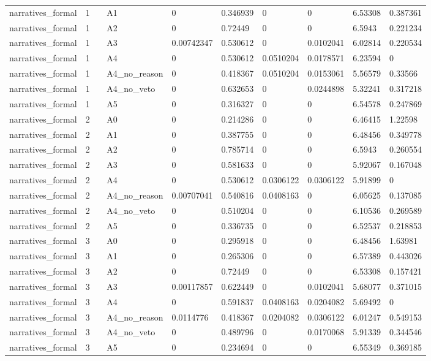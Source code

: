 \documentclass[11pt]{article}
\begin{document}
\begin{landscape}
\begin{longtable}{@{}L{0.120\linewidth}L{0.085\linewidth}L{0.085\linewidth}L{0.085\linewidth}L{0.085\linewidth}L{0.085\linewidth}L{0.085\linewidth}L{0.085\linewidth}L{0.085\linewidth}@{}}
narratives\_formal & 1 & A1 & 0 & 0.346939 & 0 & 0 & 6.53308 & 0.387361 \\
narratives\_formal & 1 & A2 & 0 & 0.72449 & 0 & 0 & 6.5943 & 0.221234 \\
narratives\_formal & 1 & A3 & 0.00742347 & 0.530612 & 0 & 0.0102041 & 6.02814 & 0.220534 \\
narratives\_formal & 1 & A4 & 0 & 0.530612 & 0.0510204 & 0.0178571 & 6.23594 & 0 \\
narratives\_formal & 1 & A4\_no\_reason & 0 & 0.418367 & 0.0510204 & 0.0153061 & 5.56579 & 0.33566 \\
narratives\_formal & 1 & A4\_no\_veto & 0 & 0.632653 & 0 & 0.0244898 & 5.32241 & 0.317218 \\
narratives\_formal & 1 & A5 & 0 & 0.316327 & 0 & 0 & 6.54578 & 0.247869 \\
narratives\_formal & 2 & A0 & 0 & 0.214286 & 0 & 0 & 6.46415 & 1.22598 \\
narratives\_formal & 2 & A1 & 0 & 0.387755 & 0 & 0 & 6.48456 & 0.349778 \\
narratives\_formal & 2 & A2 & 0 & 0.785714 & 0 & 0 & 6.5943 & 0.260554 \\
narratives\_formal & 2 & A3 & 0 & 0.581633 & 0 & 0 & 5.92067 & 0.167048 \\
narratives\_formal & 2 & A4 & 0 & 0.530612 & 0.0306122 & 0.0306122 & 5.91899 & 0 \\
narratives\_formal & 2 & A4\_no\_reason & 0.00707041 & 0.540816 & 0.0408163 & 0 & 6.05625 & 0.137085 \\
narratives\_formal & 2 & A4\_no\_veto & 0 & 0.510204 & 0 & 0 & 6.10536 & 0.269589 \\
narratives\_formal & 2 & A5 & 0 & 0.336735 & 0 & 0 & 6.52537 & 0.218853 \\
narratives\_formal & 3 & A0 & 0 & 0.295918 & 0 & 0 & 6.48456 & 1.63981 \\
narratives\_formal & 3 & A1 & 0 & 0.265306 & 0 & 0 & 6.57389 & 0.443026 \\
narratives\_formal & 3 & A2 & 0 & 0.72449 & 0 & 0 & 6.53308 & 0.157421 \\
narratives\_formal & 3 & A3 & 0.00117857 & 0.622449 & 0 & 0.0102041 & 5.68077 & 0.371015 \\
narratives\_formal & 3 & A4 & 0 & 0.591837 & 0.0408163 & 0.0204082 & 5.69492 & 0 \\
narratives\_formal & 3 & A4\_no\_reason & 0.0114776 & 0.418367 & 0.0204082 & 0.0306122 & 6.01247 & 0.549153 \\
narratives\_formal & 3 & A4\_no\_veto & 0 & 0.489796 & 0 & 0.0170068 & 5.91339 & 0.344546 \\
narratives\_formal & 3 & A5 & 0 & 0.234694 & 0 & 0 & 6.55349 & 0.369185 \\
\end{longtable}
\normalsize
\end{landscape}
\end{document}
